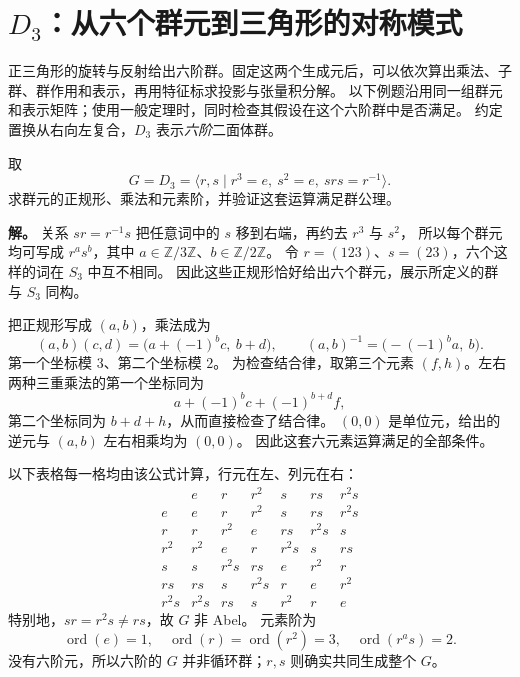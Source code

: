 \section{$D_3$：从六个群元到三角形的对称模式}
\label{sec:d3-comprehensive}

正三角形的旋转与反射给出六阶群。固定这两个生成元后，可以依次算出乘法、子群、群作用和表示，再用特征标求投影与张量积分解。
以下例题沿用同一组群元和表示矩阵；使用一般定理时，同时检查其假设在这个六阶群中是否满足。
约定置换从右向左复合，$D_3$ 表示\emph{六阶}二面体群。

\begin{workedexample}[由生成元关系计算乘法]
\label{ex:d3-comprehensive-multiplication}
取
\[
G=D_3=\langle r,s\mid r^3=e,\ s^2=e,\ srs=r^{-1}\rangle.
\]
求群元的正规形、乘法和元素阶，并验证这套运算满足群公理。

\textbf{解。} 关系 $sr=r^{-1}s$ 把任意词中的 $s$ 移到右端，再约去 $r^3$ 与 $s^2$，
所以每个群元均可写成 $r^a s^b$，其中 $a\in\mathbb Z/3\mathbb Z$、$b\in\mathbb Z/2\mathbb Z$。
令 $r=(123)$、$s=(23)$，六个这样的词在 $S_3$ 中互不相同。
因此这些正规形恰好给出六个群元，展示所定义的群与 $S_3$ 同构。

把正规形写成 $(a,b)$，乘法成为
\[
(a,b)(c,d)=\bigl(a+(-1)^b c,\ b+d\bigr),
\qquad
(a,b)^{-1}=\bigl(-(-1)^b a,\ b\bigr).
\]
第一个坐标模 $3$、第二个坐标模 $2$。
为检查结合律，取第三个元素 $(f,h)$。左右两种三重乘法的第一个坐标同为
\[
a+(-1)^b c+(-1)^{b+d}f,
\]
第二个坐标同为 $b+d+h$，从而直接检查了结合律。
$(0,0)$ 是单位元，给出的逆元与 $(a,b)$ 左右相乘均为 $(0,0)$。
因此这套六元素运算满足的全部条件。

以下表格每一格均由该公式计算，行元在左、列元在右：
\[
\begin{array}{c|rrrrrr}
 &e&r&r^2&s&rs&r^2s\\\hline
e&e&r&r^2&s&rs&r^2s\\
r&r&r^2&e&rs&r^2s&s\\
r^2&r^2&e&r&r^2s&s&rs\\
s&s&r^2s&rs&e&r^2&r\\
rs&rs&s&r^2s&r&e&r^2\\
r^2s&r^2s&rs&s&r^2&r&e
\end{array}
\]
特别地，$sr=r^2s\ne rs$，故 $G$ 非 Abel。
元素阶为
\[
\operatorname{ord}(e)=1,\quad
\operatorname{ord}(r)=\operatorname{ord}(r^2)=3,\quad
\operatorname{ord}(r^a s)=2.
\]
没有六阶元，所以六阶的 $G$ 并非循环群；$r,s$ 则确实共同生成整个 $G$。
\end{workedexample}

